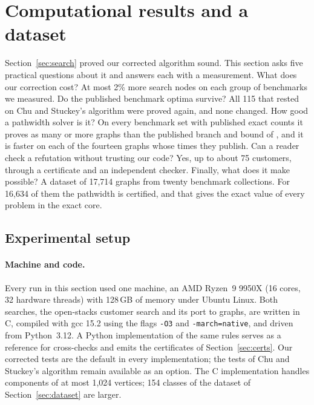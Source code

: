 \section{Computational results and a dataset}
\label{sec:results}

Section~\ref{sec:search} proved our corrected algorithm sound. This section asks
five practical questions about it and answers each with a measurement. What
does our correction cost? At most 2\% more search nodes on each group of benchmarks we measured. Do the published
benchmark optima survive? All 115 that rested on Chu and Stuckey's algorithm
\citep{ChuStuckey2009} were proved again, and none changed. How good a
pathwidth solver is it? On every benchmark set with published exact counts it proves as many or more graphs than the published branch and bound of \citet{CoudertMazauricNisse2016}, and it is faster on each of the fourteen graphs whose times they publish. Can a reader check a refutation without
trusting our code? Yes, up to about 75 customers, through a certificate and an
independent checker. Finally, what does it make possible? A dataset of 17,714
graphs from twenty benchmark collections. For 16,634 of them the pathwidth is
certified, and that gives the exact value of every problem in the exact core.

\subsection{Experimental setup}
\label{sec:setup}

\paragraph{Machine and code.} Every run in this section used one
machine, an AMD Ryzen~9 9950X (16 cores, 32 hardware threads) with 128\,GB of
memory under Ubuntu Linux. Both searches, the open-stacks customer search and
its port to graphs, are written in C, compiled with gcc 15.2 using the
flags \texttt{-O3} and \texttt{-march=native}, and driven from Python~3.12. A Python implementation of the
same rules serves as a reference for cross-checks and emits the certificates
of Section~\ref{sec:certs}. Our corrected tests are the default in every
implementation; the tests of Chu and Stuckey's algorithm remain available as an option. The C
implementation handles components of at most 1,024 vertices; 154 classes of
the dataset of Section~\ref{sec:dataset} are larger.

